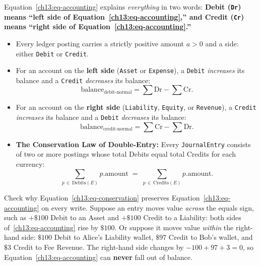 Equation~\eqref{ch13:eq-accounting} explains \emph{everything} in two words: \textbf{Debit (\texttt{Dr}) means ``left side of Equation~\eqref{ch13:eq-accounting},'' and Credit (\texttt{Cr}) means ``right side of Equation~\eqref{ch13:eq-accounting}.''}
\begin{itemize}
  \item Every ledger posting carries a strictly positive amount $a > 0$ and a side: either \texttt{Debit} or \texttt{Credit}.
  \item For an account on the \textbf{left side} (\texttt{Asset} or \texttt{Expense}), a \texttt{Debit} \emph{increases} its balance and a \texttt{Credit} \emph{decreases} its balance:
    \[
      \text{balance}_{\text{debit-normal}} = \sum \text{Dr} - \sum \text{Cr}.
    \]
  \item For an account on the \textbf{right side} (\texttt{Liability}, \texttt{Equity}, or \texttt{Revenue}), a \texttt{Credit} \emph{increases} its balance and a \texttt{Debit} \emph{decreases} its balance:
    \[
      \text{balance}_{\text{credit-normal}} = \sum \text{Cr} - \sum \text{Dr}.
    \]
  \item \textbf{The Conservation Law of Double-Entry:} Every \texttt{JournalEntry} consists of two or more postings whose total Debits equal total Credits for each currency:
    \begin{equation}
      \label{ch13:eq-conservation}
      \sum_{p \,\in\, \text{Debits}(E)} p.\text{amount} \;=\; \sum_{p \,\in\, \text{Credits}(E)} p.\text{amount}.
    \end{equation}
\end{itemize}

Check why Equation~\eqref{ch13:eq-conservation} preserves Equation~\eqref{ch13:eq-accounting} on every write. Suppose an entry moves value \emph{across} the equals sign, such as $+\$100$ Debit to an Asset and $+\$100$ Credit to a Liability: both sides of~\eqref{ch13:eq-accounting} rise by $\$100$. Or suppose it moves value \emph{within} the right-hand side: $\$100$ Debit to Alice's Liability wallet, $\$97$ Credit to Bob's wallet, and $\$3$ Credit to Fee Revenue. The right-hand side changes by $-100 + 97 + 3 = 0$, so Equation~\eqref{ch13:eq-accounting} can \textbf{never} fall out of balance.

